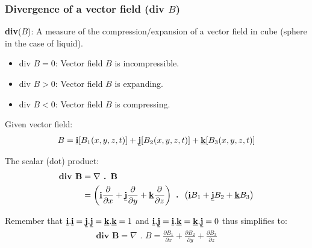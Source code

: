 \documentclass[10pt,a4paper]{article}
\begin{document}
\subsubsection{Divergence of a vector field (\textbf{div} $B$)}

\begin{tcolorbox}[breakable,colback=white]
    \textbf{div}($B$): A measure of the compression/expansion of a vector field in cube (sphere in the case of liquid).
    \begin{itemize}
        \item div $B = 0$: Vector field $B$ is incompressible.
        \item div $B > 0$: Vector field $B$ is expanding.
        \item div $B < 0$: Vector field $B$ is compressing.
    \end{itemize}
\end{tcolorbox}

Given vector field:
$$
    B = \textbf{\underline{i}}[B_1(x,y,z,t)]+\textbf{\underline{j}}[B_2(x,y,z,t)]+\textbf{\underline{k}}[B_3(x,y,z,t)]
$$

The scalar (dot) product:
\begin{align*}
    \textbf{div } \textbf{B} &= \nabla \textbf{ . B} \\
    &= \left(\textbf{\underline{i}}\frac{\partial}{\partial x}+\textbf{\underline{j}}\frac{\partial}{\partial y}+ \textbf{\underline{k}}\frac{\partial}{\partial z}\right)\textbf{ . }\left(\textbf{\underline{i}}B_1+\textbf{\underline{j}}B_2+\textbf{\underline{k}}B_3\right)
\end{align*}

\begin{tcolorbox}[breakable,colback=white]
    Remember that $\textbf{\underline{i}}.\textbf{\underline{i}} =
    \textbf{\underline{j}}.\textbf{\underline{j}}=\textbf{\underline{k}}.\textbf{\underline{k}}=1$ and
    $\textbf{\underline{i}}.\textbf{\underline{j}}=\textbf{\underline{i}}.\textbf{\underline{k}}=\textbf{\underline{k}}.\textbf{\underline{j}}=0$
    thus simplifies to:
    \begin{align*}
        \textbf{div } \textbf{B} = \nabla \textbf{ . }B = \frac{\partial B_1}{\partial x} + \frac{\partial B_2}{\partial y} + \frac{\partial B_3}{\partial z}
    \end{align*}
\end{tcolorbox}
\end{document}
